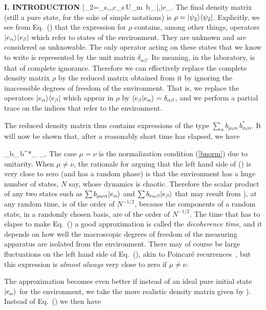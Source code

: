 \begin{center}{\bf I. INTRODUCTION}
\beq |\psi_2\9=\sum_{s,\mu,\xi,\alpha}c_s\,U_{m\mu\xi}\,
  b_{\mu\omega\alpha}\,|\mu,\xi\9\0|e_\alpha\9. \eeq
The final density matrix (still a pure state, for the sake of simple
notations) is $\rho=|\psi_2\rangle\langle\psi_2|$. Explicitly, we see from
Eq.~(\theequation) that the expression for $\rho$ contains, among other
things, operators $|e_\alpha\rangle\langle e_\beta|$ which refer to states of the
environment. They are unknown and are considered as unknowable. The only
operator acting on these states that we know to write is represented by
the unit matrix $\delta_{\alpha\beta}$. Its meaning, in the laboratory,
is that of complete ignorance. Therefore we can effectively replace the
complete density matrix $\rho$ by the reduced matrix obtained from it by
ignoring the inaccessible degrees of freedom of the environment. That
is, we replace the operators $|e_\alpha\rangle\langle e_\beta|$ which appear in
$\rho$ by $\langle e_\beta|e_\alpha\rangle=\delta_{\alpha\beta}$, and we perform a
partial trace on the indices that refer to the environment.

The reduced density matrix thus contains expressions of the type
$\sum_\alpha b_{\mu\omega\alpha}\,b^*_{\nu\omega\alpha}$. It will now be
shown that, after a reasonably short time has elapsed, we have

\beq \sum_\alpha b_{\mu\omega\alpha}\,b^*_{\nu\omega\alpha}\simeq
  \delta_{\mu\nu}. \label{decohe} \eeq
The case $\mu=\nu$ is the normalization condition (\ref{bnorm}) due to
unitarity. When $\mu\neq\nu$, the rationale for arguing that the left
hand side of (\theequation) is very close to zero (and has a random
phase) is that the environment has a huge number of states, $N$ say,
whose dynamics is chaotic. Therefore the scalar product of any two
states such as $\sum b_{\mu\omega\alpha}|e_\alpha\rangle$ and $\sum
b_{\nu\omega\beta}|e_\beta\rangle$ that may result from ), at any
random time, is of the order of $N^{-1/2}$, because the components of a
random state, in a randomly chosen basis, are of the order of
$N^{-1/2}$. The time that has to elapse to make Eq.~(\theequation) a
good approximation is called the {\it decoherence time\/}, and it
depends on how well the macroscopic degrees of freedom of the measuring
apparatus are isolated from the environment. There may of course be
large fluctuations on the left hand side of Eq.~(\theequation), akin to
Poincar\'e recurrences~\cite{schul}, but this expression is {\it almost
always\/} very close to zero if $\mu\neq\nu$.

The approximation becomes even better if instead of an ideal pure
initial state $|e_\omega\rangle$ for the environment, we take the more
realistic density matrix given by ). Instead of
Eq.~(\theequation) we then have


\end{center}
